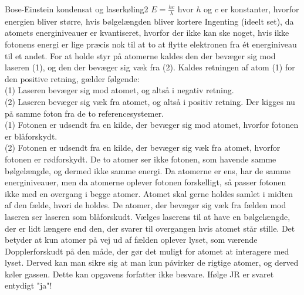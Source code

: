 \begin{opgave}{Bose-Einstein kondensat og laserkøling}{2}
\opg $E = \frac{hc}{\lambda}$ hvor $h$ og $c$ er konstanter, hvorfor energien bliver større, hvis bølgelængden bliver kortere
\opg Ingenting (ideelt set), da atomets energiniveauer er kvantiseret, hvorfor der ikke kan ske noget, hvis ikke fotonens energi er lige præcis nok til at to at flytte elektronen fra ét energiniveau til et andet.
\opg For at holde styr på atomerne kaldes den der bevæger sig mod laseren (1), og den der bevæger sig væk fra (2). Kaldes retningen af atom (1) for den positive retning, gælder følgende: \\
(1) Laseren bevæger sig mod atomet, og altså i negativ  retning. \\
(2) Laseren bevæger sig væk fra atomet, og altså i positiv retning.
\opg Der kigges nu på samme foton fra de to referencesystemer. \\
(1) Fotonen er udsendt fra en kilde, der bevæger sig mod atomet, hvorfor fotonen er blåforskydt. \\
(2) Fotonen er udsendt fra en kilde, der bevæger sig væk fra atomet, hvorfor fotonen er rødforskydt.
\opg De to atomer ser ikke fotonen, som havende samme bølgelængde, og dermed ikke samme energi. Da atomerne er ens, har de samme energiniveauer, men da atomerne oplever fotonen forskelligt, så passer fotonen ikke med en overgang i begge atomer.
\opg Atomet skal gerne holdes samlet i midten af den fælde, hvori de holdes. De atomer, der bevæger sig væk fra fælden mod laseren ser laseren som blåforskudt. Vælges laserens til at have en bølgelængde, der er lidt længere end den, der svarer til overgangen hvis atomet står stille. Det betyder at kun atomer på vej ud af fælden oplever lyset, som værende Dopplerforskudt på den måde, der gør det muligt for atomet at interagere med lyset. Derved kan man sikre sig at man kun påvirker de rigtige atomer, og derved køler gassen.
\opg Dette kan opgavens forfatter ikke besvare. Ifølge JR er svaret entydigt "ja"!
\end{opgave}